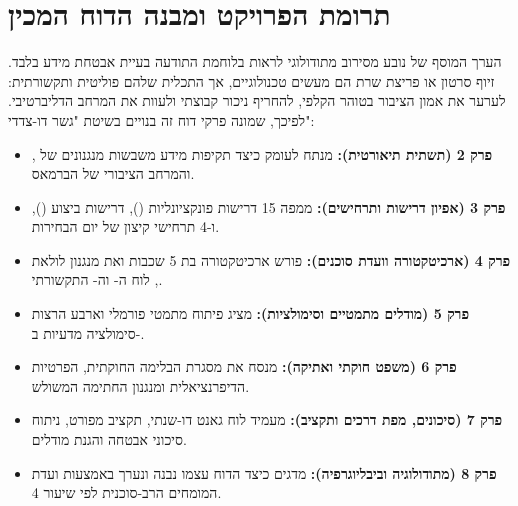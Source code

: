\section{תרומת הפרויקט ומבנה הדוח המכין}
הערך המוסף של  נובע מסירוב מתודולוגי לראות בלוחמת התודעה בעיית אבטחת מידע בלבד. זיוף סרטון או פריצת שרת הם מעשים טכנולוגיים, אך התכלית שלהם פוליטית ותקשורתית: לערער את אמון הציבור בטוהר הקלפי, להחריף ניכור קבוצתי ולעוות את המרחב הדליברטיבי. לפיכך, שמונה פרקי דוח זה בנויים בשיטת "גשר דו-צדדי":

\begin{theorybox}
\begin{itemize}
    \item \textbf{פרק 2 (תשתית תיאורטית):} מנתח לעומק כיצד תקיפות מידע משבשות מנגנונים של ,  והמרחב הציבורי של הברמאס.
    \item \textbf{פרק 3 (אפיון דרישות ותרחישים):} ממפה 15 דרישות פונקציונליות (), דרישות ביצוע (), ו-4 תרחישי קיצון של יום הבחירות.
    \item \textbf{פרק 4 (ארכיטקטורה וועדת סוכנים):} פורש ארכיטקטורה בת 5 שכבות ואת מנגנון לולאת , לוח ה- וה- התקשורתי.
    \item \textbf{פרק 5 (מודלים מתמטיים וסימולציות):} מציג פיתוח מתמטי פורמלי וארבע הרצות סימולציה מדעיות ב-.
    \item \textbf{פרק 6 (משפט חוקתי ואתיקה):} מנסח את מסגרת הבלימה החוקתית, הפרטיות הדיפרנציאלית ומנגנון החתימה המשולש.
    \item \textbf{פרק 7 (סיכונים, מפת דרכים ותקציב):} מעמיד לוח גאנט דו-שנתי, תקציב מפורט, ניתוח סיכוני אבטחה והגנת מודלים.
    \item \textbf{פרק 8 (מתודולוגיה וביבליוגרפיה):} מדגים כיצד הדוח עצמו נבנה ונערך באמצעות ועדת המומחים הרב-סוכנית לפי שיעור 4.
\end{itemize}
\end{theorybox}
